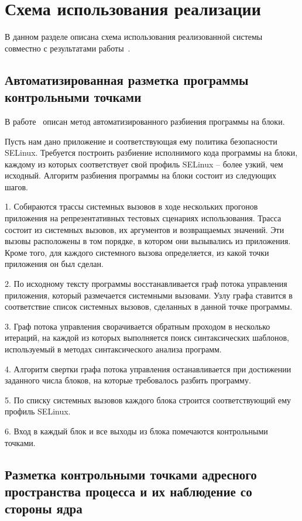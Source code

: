 \section{Схема использования реализации}

В данном разделе описана схема использования
реализованной системы совместно с результатами
работы~\cite{gornak}.

\subsection{Автоматизированная разметка программы
            контрольными точками}

В работе~\cite{gornak} описан метод автоматизированного
разбиения программы на блоки.

Пусть нам дано приложение и соответствующая ему политика
безопасности SELinux. Требуется построить разбиение
исполнимого кода программы на блоки, каждому из которых
соответствует свой профиль SELinux -- более узкий,
чем исходный. Алгоритм разбиения программы на блоки
состоит из следующих шагов.

1. Собираются трассы системных вызовов в ходе нескольких
прогонов приложения на репрезентативных тестовых сценариях
использования. Трасса состоит из системных вызовов, их
аргументов и возвращаемых значений. Эти вызовы расположены
в том порядке, в котором они вызывались из приложения.
Кроме того, для каждого системного вызова определяется,
из какой точки приложения он был сделан.

2. По исходному тексту программы восстанавливается граф потока
управления приложения, который размечается системными вызовами.
Узлу графа ставится в соответствие список системных вызовов,
сделанных в данной точке программы.

3. Граф потока управления сворачивается обратным проходом
в несколько итераций, на каждой из которых выполняется
поиск синтаксических шаблонов, используемый в методах
синтаксического анализа программ.

4. Алгоритм свертки графа потока управления останавливается
при достижении заданного числа блоков, на которые требовалось
разбить программу.

5. По списку системных вызовов каждого блока строится соответствующий
ему профиль SELinux.

6. Вход в каждый блок и все выходы из блока помечаются контрольными
точками.

\subsection{Разметка контрольными точками адресного пространства
                процесса и их наблюдение со стороны ядра}

